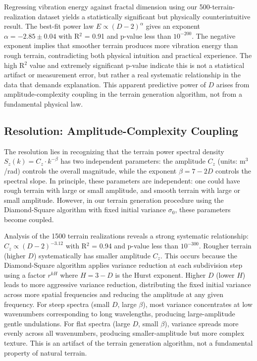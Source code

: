 \documentclass[11pt,letterpaper]{article}
\begin{document}
Regressing vibration energy against fractal dimension using our 500-terrain-realization dataset yields a statistically significant but physically counterintuitive result. The best-fit power law $E \propto (D-2)^\alpha$ gives an exponent $\alpha = -2.85 \pm 0.04$ with R$^2$ = 0.91 and p-value less than $10^{-200}$. The negative exponent implies that smoother terrain produces more vibration energy than rough terrain, contradicting both physical intuition and practical experience. The high R$^2$ value and extremely significant p-value indicate this is not a statistical artifact or measurement error, but rather a real systematic relationship in the data that demands explanation. This apparent predictive power of $D$ arises from amplitude-complexity coupling in the terrain generation algorithm, not from a fundamental physical law.

\subsection{Resolution: Amplitude-Complexity Coupling}

The resolution lies in recognizing that the terrain power spectral density $S_z(k) = C_z \cdot k^{-\beta}$ has two independent parameters: the amplitude $C_z$ (units: m$^3$/rad) controls the overall magnitude, while the exponent $\beta = 7-2D$ controls the spectral slope. In principle, these parameters are independent: one could have rough terrain with large or small amplitude, and smooth terrain with large or small amplitude. However, in our terrain generation procedure using the Diamond-Square algorithm with fixed initial variance $\sigma_0$, these parameters become coupled.

Analysis of the 1500 terrain realizations reveals a strong systematic relationship: $C_z \propto (D-2)^{-3.12}$ with R$^2$ = 0.94 and p-value less than $10^{-300}$. Rougher terrain (higher $D$) systematically has smaller amplitude $C_z$. This occurs because the Diamond-Square algorithm applies variance reduction at each subdivision step using a factor $r^{kH}$ where $H = 3-D$ is the Hurst exponent. Higher $D$ (lower $H$) leads to more aggressive variance reduction, distributing the fixed initial variance across more spatial frequencies and reducing the amplitude at any given frequency. For steep spectra (small $D$, large $\beta$), most variance concentrates at low wavenumbers corresponding to long wavelengths, producing large-amplitude gentle undulations. For flat spectra (large $D$, small $\beta$), variance spreads more evenly across all wavenumbers, producing smaller-amplitude but more complex texture. This is an artifact of the terrain generation algorithm, not a fundamental property of natural terrain.
\end{document}
